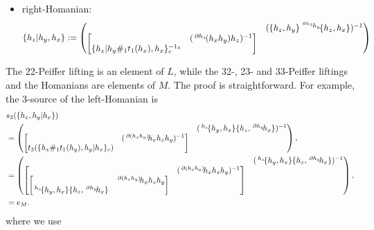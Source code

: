 \documentclass[11pt, reqno]{amsart} %
\newcommand{\act}[1]{\,\sp{#1}\!}
\theoremstyle{definition}
\theoremstyle{remark}
\numberwithin{equation}{section}
\begin{document}
\begin{center}
\begin{itemize}
\[  \]
  \item right-Homanian:
  \[
    \{h_z|h_y,h_x\} := \begin{pmatrix} & (\{h_z,h_y\}\act{\act{\partial h_z}h_y}\{h_z,h_x\})^{-1} \\ \begin{bmatrix} & (\act{\partial h_z}(h_xh_y)h_z)^{-1} \\ \{h_z|h_y\#_1t_1(h_x),h_x\}_c^{-1_4} & \end{bmatrix} & \end{pmatrix}
  \]
\end{itemize}
\end{center}
The 22-Peiffer lifting is an element of $L$, while the 32-, 23- and 33-Peiffer liftings and the Homanians are elements of $M$. The proof is straightforward. For example, the 3-source of the left-Homanian is
\begin{align*}
  &s_3(\{h_z,h_y|h_x\}) \\
  &= \begin{pmatrix} & (\act{h_z}\{h_y,h_x\}\{h_z,\act{\partial h_y}h_x\})^{-1} \\ \begin{bmatrix} & (\act{\partial(h_zh_y)}h_xh_zh_y)^{-1} \\ t_3(\{h_z\#_1t_1(h_y),h_y|h_x\}_c) & \end{bmatrix} & \end{pmatrix}, \\
  &= \begin{pmatrix} & (\act{h_z}\{h_y,h_x\}\{h_z,\act{\partial h_y}h_x\})^{-1} \\ \begin{bmatrix} & (\act{\partial(h_zh_y)}h_xh_zh_y)^{-1} \\ \begin{bmatrix}&\act{\partial(h_zh_y)}h_xh_zh_y \\ \act{h_z}\{h_y,h_x\}\{h_z,\act{\partial h_y}h_x\} & \end{bmatrix} & \end{bmatrix} & \end{pmatrix}, \\
  &= e_M.
\end{align*}
where we use
\end{document}
